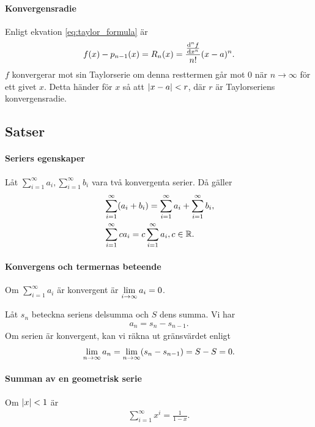 \paragraph{Konvergensradie}
Enligt ekvation \ref{eq:taylor_formula} är
\begin{align*}
	f(x) - p_{n-1}(x) = R_n(x) = \frac{\dv[n]{f}{x} (\alpha)}{n!}(x - a)^n.
\end{align*}
$f$ konvergerar mot sin Taylorserie om denna resttermen går mot $0$ när $n\to\infty$ för ett givet $x$. Detta händer för $x$ så att $\abs{x -a} < r$, där $r$ är Taylorseriens konvergensradie.

\subsection{Satser}

\paragraph{Seriers egenskaper}
Låt $\sum\limits_{i = 1}^{\infty}a_i, \sum\limits_{i = 1}^{\infty}b_i$ vara två konvergenta serier. Då gäller
\begin{align*}
	&\sum\limits_{i = 1}^{\infty}(a_i + b_i) = \sum\limits_{i = 1}^{\infty}a_i + \sum\limits_{i = 1}^{\infty}b_i, \\
	&\sum\limits_{i = 1}^{\infty}ca_i = c\sum\limits_{i = 1}^{\infty}a_i, c\in\mathbb{R}.
\end{align*}

\proof

\paragraph{Konvergens och termernas beteende}
Om $\sum\limits_{i = 1}^{\infty}a_i$ är konvergent är $\lim\limits_{i\to \infty}a_i = 0$.

\proof
Låt $s_n$ beteckna seriens delsumma och $S$ dens summa. Vi har
\begin{align*}
	a_n = s_n - s_{n - 1}.
\end{align*}
Om serien är konvergent, kan vi räkna ut gränsvärdet enligt
\begin{align*}
	\lim\limits_{n\to \infty}a_n = \lim\limits_{n\to \infty}(s_n - s_{n - 1}) = S - S = 0.
\end{align*}

\paragraph{Summan av en geometrisk serie}
Om $\abs{x} < 1$ är
\begin{align*}
	\sum\limits_{i = 1}^{\infty}x^i = \frac{1}{1 - x}.
\end{align*}

